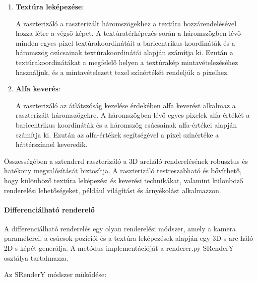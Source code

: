 \documentclass[12pt,a4]{article}
\begin{document}
\begin{enumerate}
                \item \textbf{Textúra leképezése}:
         
                        A raszterizáló a raszterizált háromszögekhez a textúra hozzárendelésével  hozza létre a végső képet. 
                        A textúratérképezés során a háromszögben lévő minden egyes pixel textúrakoordinátáit a baricentrikus koordináták és a háromszög csúcsainak textúrakoordinátái alapján számítja ki.
            	        Ezután a textúrakoordinátákat a megfelelő helyen a textúrakép mintavételezéséhez használjuk, és a mintavételezett texel színértékét rendeljük a pixelhez.
     
                 \item \textbf{Alfa keverés}:
                 
                        A raszterizáló az átlátszóság kezelése érdekében alfa keverést alkalmaz a raszterizált háromszögekre. 
                    	A háromszögben lévő egyes pixelek alfa-értékét a baricentrikus koordináták és a háromszög csúcsainak alfa-értékei alapján számítja ki. 
                    	Ezután az alfa-értékek segítségével a pixel színértéke a háttérszínnel keveredik.
     
            \end{enumerate}
     
             Összességében a sztenderd raszterizáló a 3D archáló renderelésének robusztus és hatékony megvalósítását biztosítja.
             A raszterizáló testreszabható és bővíthető, hogy különböző textúra leképezési és keverési technikákat, valamint különböző renderelési lehetőségeket, például világítást és árnyékolást alkalmazzon.
         
        \paragraph{Differenciálható renderelő}
             A differenciálható renderelés egy olyan renderelési módszer, amely a kamera paraméterei, a csúcsok pozíciói és a textúra leképezések alapján egy 3D-s arc háló 2D-s képét generálja. A metódus implementációját a renderer.py SRenderY osztálya tartalmazza. 

             Az SRenderY módszer mükődése:
            
\end{document}

